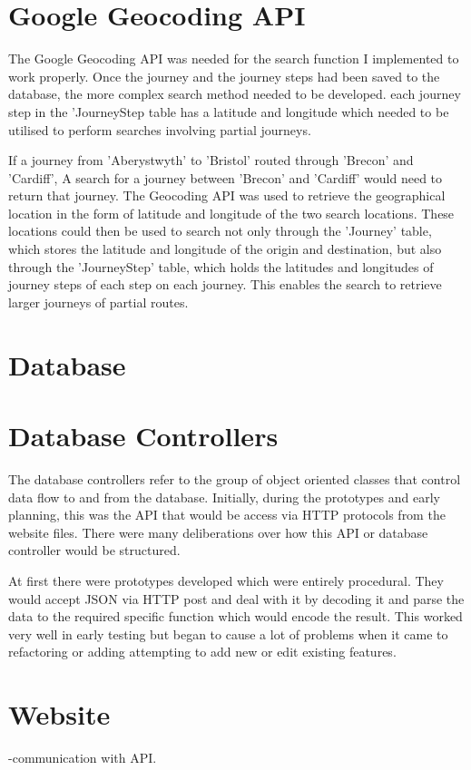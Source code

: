 \section{Google Geocoding API}
	The Google Geocoding API\cite{google_geocoding_api} was needed for the search function I implemented to work properly. Once the journey and the journey steps had been saved to the database, the more complex search method needed to be developed. each journey step in the 'Journey\textunderscore Step table has a latitude and longitude which needed to be utilised to perform searches involving partial journeys. 
	
	If a journey from 'Aberystwyth' to 'Bristol' routed through 'Brecon' and 'Cardiff', A search for a journey between 'Brecon' and 'Cardiff' would need to return that journey. The Geocoding API was used to retrieve the geographical location in the form of latitude and longitude of the two search locations. These locations could then be used to search not only through the 'Journey' table, which stores the latitude and longitude of the origin and destination, but also through the 'Journey\textunderscore Step' table, which holds the latitudes and longitudes of journey steps of each step on each journey. This enables the search to retrieve larger journeys of partial routes.
	
\section{Database}
	
	
\section{Database Controllers}
	The database controllers refer to the group of object oriented classes that control data flow to and from the database. Initially, during the prototypes and early planning, this was the API that would be access via HTTP protocols from the website files. There were many deliberations over how this API or database controller would be structured.
	
	At first there were prototypes developed which were entirely procedural. They would accept JSON via HTTP post and deal with it by decoding it and parse the data to the required specific function which would encode the result. This worked very well in early testing but began to cause a lot of problems when it came to refactoring or adding attempting to add new or edit existing features.
	
\section{Website}
	-communication with API.
